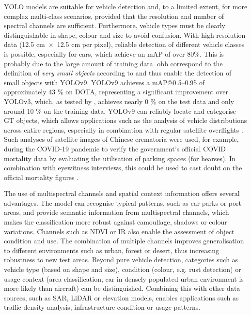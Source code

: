 YOLO models are suitable for vehicle detection and, to a limited extent, for more complex multi-class scenarios, provided that the resolution and number of spectral channels are sufficient. Furthermore, vehicle types must be clearly distinguishable in shape, colour and size to avoid confusion. With high-resolution data (12.5 cm~$\times$~12.5 cm per pixel), reliable detection of different vehicle classes is possible, especially for cars, which achieve an mAP of over 80\%. This is probably due to the large amount of training data. \acrshort{obb} correspond to the definition of \textit{very small objects} according to \citeauthor{Chen2017} \cite{Chen2017} and thus enable the detection of small objects with \acrshort{YOLO}v9. YOLOv9 achieves a \acrshort{mAP}@0.5–0.95 of approximately 43 \% on \acrshort{DOTA}, representing a significant improvement over YOLOv3, which, as tested by \citeauthor{Balzer2022} \cite{Balzer2022}, achieves nearly 0 \% on the test data and only around 10 \% on the training data.  \acrshort{YOLO}v9 can reliably locate and categorise \Acrlong{GT} objects, which allows applications such as the analysis of vehicle distributions across entire regions, especially in combination with regular satellite overflights \cite{planet_labs, airbus_neo}. Such analyses of satellite images of Chinese crematoria were used, for example, during the COVID-19 pandemic to verify the government's official COVID mortality data by evaluating the utilisation of parking spaces (for hearses). In combination with eyewitness interviews, this could be used to cast doubt on the official mortality figures \cite{Spiegel_article}.  

The use of multispectral channels and spatial context information offers several advantages. The model can recognise typical patterns, such as car parks or port areas, and provide semantic information from multispectral channels, which makes the classification more robust against camouflage, shadows or colour variations. Channels such as \acrshort{NDVI} or \acrshort{IR} also enable the assessment of object condition and use. The combination of multiple channels improves generalisation to different environments such as urban, forest or desert, thus increasing robustness to new test areas. Beyond pure vehicle detection, categories such as vehicle type (based on shape and size), condition (colour, e.g. rust detection) or usage context (area classification, car in densely populated urban environment is more likely than aircraft) can be distinguished. Combining this with other data sources, such as \acrshort{SAR}, \acrshort{LiDAR} or elevation models, enables applications such as traffic density analysis, infrastructure condition or usage patterns.



